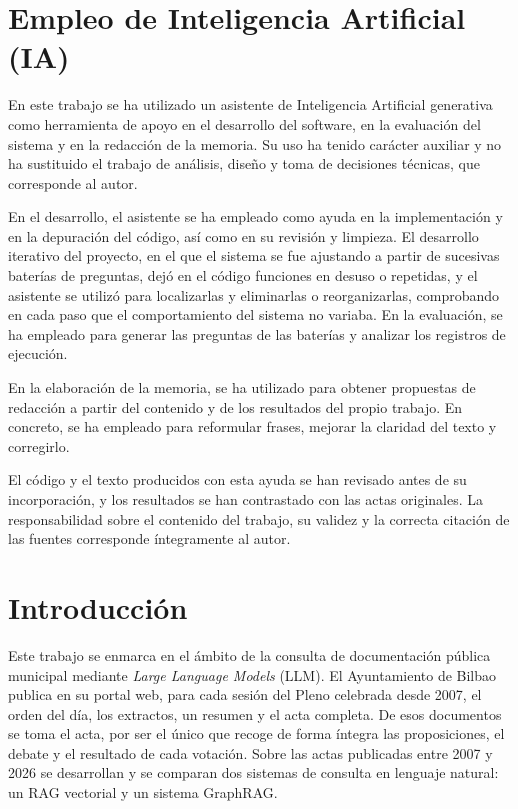 \documentclass[11pt, a4paper]{report}
\begin{document}
	\chapter*{Empleo de Inteligencia Artificial (IA)}

	En este trabajo se ha utilizado un asistente de Inteligencia Artificial
	generativa como herramienta de apoyo en el desarrollo del software, en la
	evaluación del sistema y en la redacción de la memoria. Su uso ha tenido
	carácter auxiliar y no ha sustituido el trabajo de análisis, diseño y toma
	de decisiones técnicas, que corresponde al autor.

	En el desarrollo, el asistente se ha empleado como ayuda en la
	implementación y en la depuración del código, así como en su revisión y
	limpieza. El desarrollo iterativo del proyecto, en el que el sistema se fue
	ajustando a partir de sucesivas baterías de preguntas, dejó en el código
	funciones en desuso o repetidas, y el asistente se utilizó para localizarlas
	y eliminarlas o reorganizarlas, comprobando en cada paso que el
	comportamiento del sistema no variaba. En la evaluación, se ha empleado
	para generar las preguntas de las baterías y analizar los registros de
	ejecución.

	En la elaboración de la memoria, se ha utilizado para obtener propuestas de
	redacción a partir del contenido y de los resultados del propio trabajo.
	En concreto, se ha empleado para reformular frases, mejorar la claridad del
	texto y corregirlo.

	El código y el texto producidos con esta ayuda se han revisado antes de su
	incorporación, y los resultados se han contrastado con las actas originales.
	La responsabilidad sobre el contenido del trabajo, su validez y la correcta
	citación de las fuentes corresponde íntegramente al autor.

	\chapter{Introducción}
	\label{ch:introduccion}

	Este trabajo se enmarca en el ámbito de la consulta de documentación pública
	municipal mediante \textit{Large Language Models} (LLM). El Ayuntamiento
	de Bilbao publica en su portal web, para cada sesión del Pleno celebrada desde
	2007, el orden del día, los extractos, un resumen y el acta completa. De esos
	documentos se toma el acta, por ser el único que recoge de forma íntegra las
	proposiciones, el debate y el resultado de cada votación. Sobre las actas
	publicadas entre 2007 y 2026 se desarrollan y se comparan dos sistemas de
	consulta en lenguaje natural: un RAG vectorial y un sistema GraphRAG.
\end{document}
